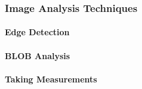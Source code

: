 \subsubsection{Image Analysis Techniques}
	\paragraph{Edge Detection}
	\paragraph{BLOB Analysis}
	\paragraph{Taking Measurements}